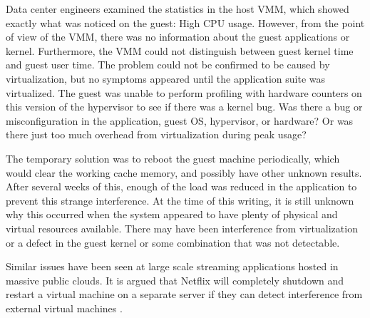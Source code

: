 Data center engineers examined the statistics in the host VMM, which showed exactly what was noticed on the guest:  High CPU usage.   However, from the point of view of the VMM, there was no information about the guest applications or kernel.  Furthermore, the VMM could not distinguish between guest kernel time and guest user time.  The problem could not be confirmed to be caused by virtualization, but no symptoms appeared until the application suite was virtualized.  The guest was unable to perform profiling with hardware counters on this version of the hypervisor \cite{serebrin} to see if there was a kernel bug.  Was there a bug or misconfiguration in the application, guest OS, hypervisor, or hardware?  Or was there just too much overhead from virtualization during peak usage? 

The temporary solution was to reboot the guest machine periodically, which would clear the working cache memory, and possibly have other unknown results.  After several weeks of this, enough of the load was reduced in the application to prevent this strange interference.  At the time of this writing, it is still unknown why this occurred when the system appeared to have plenty of physical and virtual resources available. There may have been interference from virtualization or a defect in the guest kernel or some combination that was not detectable. 

Similar issues have been seen at large scale streaming applications hosted in massive public clouds.  
It is argued that Netflix will completely shutdown and restart a virtual machine on a separate server if they can detect interference from external virtual machines \cite{netflix}.

\begin{comment}
They are using a new feature in the \emph{top} command called \emph{steal time} to detect if too much of the CPU is being used by other virtual machines.

\indent These examples show the need for additional tools and resource utilization techniques are needed in the guests and the VMM.  
Our experiments will reproduce similar performance problems when multiple guests are run concurrently. 
We show that even when resources are evenly distributed there is additional interference that is undetectable with current tools. 
\end{comment}
